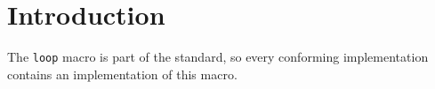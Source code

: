 \section{Introduction}

The \texttt{loop} macro is part of the \commonlisp{} standard, so
every conforming \commonlisp{} implementation contains an
implementation of this macro. 
